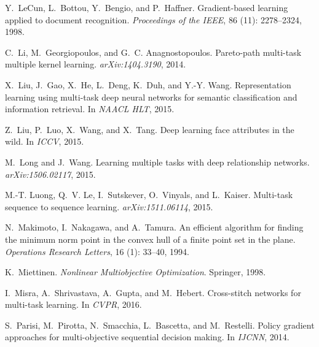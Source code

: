 \documentclass{article}
\begin{document}
{\begin{thebibliography}{60}
Y.~LeCun, L.~Bottou, Y.~Bengio, and P.~Haffner.
\newblock Gradient-based learning applied to document recognition.
\newblock \emph{Proceedings of the IEEE}, 86 (11):
  2278--2324, 1998.

C.~Li, M.~Georgiopoulos, and G.~C. Anagnostopoulos.
\newblock Pareto-path multi-task multiple kernel learning.
\newblock \emph{arXiv:1404.3190}, 2014.

X.~Liu, J.~Gao, X.~He, L.~Deng, K.~Duh, and Y.-Y. Wang.
\newblock Representation learning using multi-task deep neural networks for
  semantic classification and information retrieval.
\newblock In \emph{NAACL HLT}, 2015{}.

Z.~Liu, P.~Luo, X.~Wang, and X.~Tang.
\newblock Deep learning face attributes in the wild.
\newblock In \emph{{ICCV}}, 2015{}.

M.~Long and J.~Wang.
\newblock Learning multiple tasks with deep relationship networks.
\newblock \emph{arXiv:1506.02117}, 2015.

M.-T. Luong, Q.~V. Le, I.~Sutskever, O.~Vinyals, and L.~Kaiser.
\newblock Multi-task sequence to sequence learning.
\newblock \emph{arXiv:1511.06114}, 2015.

N.~Makimoto, I.~Nakagawa, and A.~Tamura.
\newblock An efficient algorithm for finding the minimum norm point in the
  convex hull of a finite point set in the plane.
\newblock \emph{Operations Research Letters}, 16 (1): 33--40,
  1994.

K.~Miettinen.
\newblock \emph{Nonlinear Multiobjective Optimization}.
\newblock Springer, 1998.

I.~Misra, A.~Shrivastava, A.~Gupta, and M.~Hebert.
\newblock Cross-stitch networks for multi-task learning.
\newblock In \emph{CVPR}, 2016.

S.~Parisi, M.~Pirotta, N.~Smacchia, L.~Bascetta, and M.~Restelli.
\newblock Policy gradient approaches for multi-objective sequential decision
  making.
\newblock In \emph{IJCNN}, 2014.


\end{thebibliography}}
\end{document}
